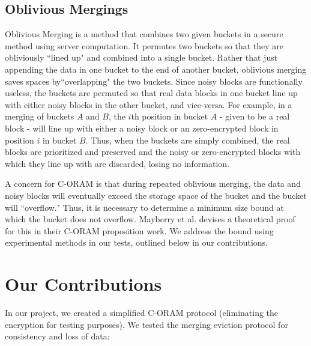 \documentclass[12pt, oneside]{article}   	%
\begin{document}
\subsection{Oblivious Mergings}
Oblivious Merging is a method that combines two given buckets in a secure method using server computation. It permutes two buckets so that they are obliviously ``lined up" and combined into a single bucket. Rather that just appending the data in one bucket to the end of another bucket, oblivious merging saves spaces by``overlapping" the two buckets. Since noisy blocks are functionally useless, the buckets are permuted so that real data blocks in one bucket line up with either noisy blocks in the other bucket, and vice-versa. For example, in a merging of buckets $A$ and $B$, the $i$th position in bucket $A$ - given to be a real block - will line up with either a noisy block or an zero-encrypted block in position $i$ in bucket $B$. Thus, when the buckets are simply combined, the real blocks are prioritized and preserved and the noisy or zero-encrypted blocks with which they line up with are discarded, losing no information. 


A concern for C-ORAM is that during repeated oblivious merging, the data and noisy blocks will eventually exceed the storage space of the bucket and the bucket will ``overflow." Thus, it is necessary to determine a minimum size bound at which the bucket does not overflow. Mayberry et al. devises a theoretical proof for this in their C-ORAM proposition work. We address the bound using experimental methods in our tests, outlined below in our contributions.




\section{Our Contributions}

In our project, we created a simplified C-ORAM protocol (eliminating the encryption for testing purposes). We tested the merging eviction protocol for consistency and loss of data:
\end{document}
